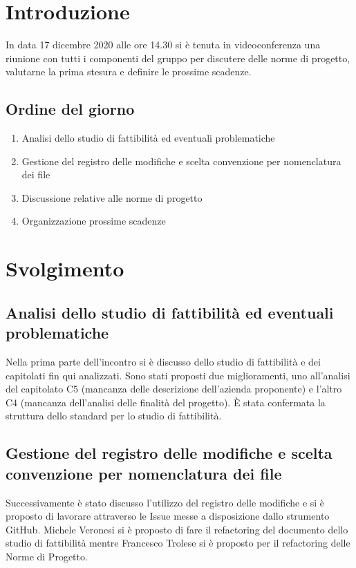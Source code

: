 \section{Introduzione}
In data 17 dicembre 2020 alle ore 14.30 si è tenuta in videoconferenza una riunione con tutti i componenti del gruppo per discutere delle norme di progetto, valutarne la prima stesura e definire le prossime scadenze.
\subsection{Ordine del giorno}
\begin{enumerate}
    \item Analisi dello studio di fattibilità ed eventuali problematiche
    \item Gestione del registro delle modifiche e scelta convenzione per nomenclatura dei file
    \item Discussione relative alle norme di progetto
    \item Organizzazione prossime scadenze 
\end{enumerate}

\section{Svolgimento}
\subsection{Analisi dello studio di fattibilità ed eventuali problematiche}
Nella prima parte dell'incontro si è discusso dello studio di fattibilità e dei capitolati fin qui analizzati. Sono stati proposti due miglioramenti, uno all'analisi del capitolato C5 (mancanza delle descrizione dell'azienda proponente) e l'altro C4 (mancanza dell'analisi delle finalità del progetto). È stata confermata la struttura dello standard per lo studio di fattibilità. 

\subsection{Gestione del registro delle modifiche e scelta convenzione per nomenclatura dei file}
Successivamente è stato discusso l'utilizzo del registro delle modifiche e si è proposto di lavorare attraverso le Issue messe a disposizione dallo strumento GitHub. Michele Veronesi si è proposto di fare il refactoring del documento  dello studio di fattibilità mentre Francesco Trolese si è proposto per il refactoring delle Norme di Progetto. 

